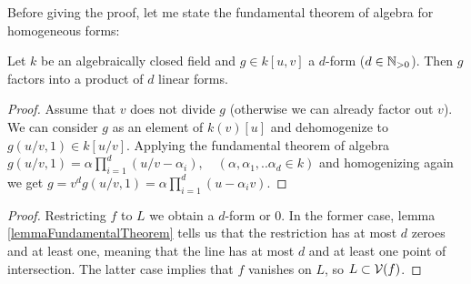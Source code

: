 Before giving the proof, let me state the fundamental theorem of algebra for homogeneous forms:

\begin{lemma} \label{lemmaFundamentalTheorem}
Let $k$ be an algebraically closed field and $g \in k[u,v]$ a $d$-form ($d \in \operatorname{\mathbb N_{>0}}$).
Then $g$ factors into a product of $d$ linear forms.
\end{lemma}
\begin{proof}
Assume that $v$ does not divide $g$ (otherwise we can already factor out $v$).
We can consider $g$ as an element of $k(v)[u]$ and dehomogenize to $g(u/v,1) \in k[u/v]$.
Applying the fundamental theorem of algebra $g(u/v,1) = \alpha\prod_{i=1}^d(u/v - \alpha_i), \quad (\alpha,\alpha_1,..\alpha_d \in k)$ and homogenizing again we get
$g = v^d g(u/v,1) = \alpha\prod_{i=1}^d(u - \alpha_iv)$.
\end{proof}

\begin{proof}
Restricting $f$ to $L$ we obtain a $d$-form or 0.
In the former case, lemma \ref{lemmaFundamentalTheorem} tells us that the restriction has at most $d$ zeroes and at least one, meaning that the line has at most $d$ and at least one point of intersection.
The latter case implies that $f$ vanishes on $L$, so $L \subset \operatorname{\mathcal V}(f)$.
\end{proof}
